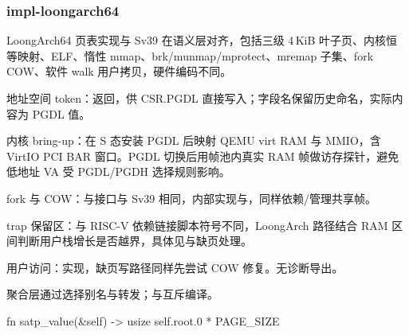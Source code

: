 
\subsubsection{impl-loongarch64}

LoongArch64 页表实现与 Sv39 在语义层对齐，包括三级 4\,KiB 叶子页、内核恒等映射、ELF、惰性 mmap、brk/munmap/mprotect、mremap 子集、fork COW、软件 walk 用户拷贝，硬件编码不同。

地址空间 token：返回，供 CSR.PGDL 直接写入；字段名保留历史命名，实际内容为 PGDL 值。

内核 bring-up：在 S 态安装 PGDL 后映射 QEMU virt RAM 与 MMIO，含 VirtIO PCI BAR 窗口。PGDL 切换后用帧池内真实 RAM 帧做访存探针，避免低地址 VA 受 PGDL/PGDH 选择规则影响。

fork 与 COW：与接口与 Sv39 相同，内部实现与，同样依赖/管理共享帧。

trap 保留区：与 RISC-V 依赖链接脚本符号不同，LoongArch 路径结合 RAM 区间判断用户栈增长是否越界，具体见与缺页处理。

用户访问：实现，缺页写路径同样先尝试 COW 修复。无诊断导出。

聚合层通过选择别名与转发；与互斥编译。

\begin{rustcode}
fn satp_value(&self) -> usize { self.root.0 * PAGE_SIZE }
\end{rustcode}

